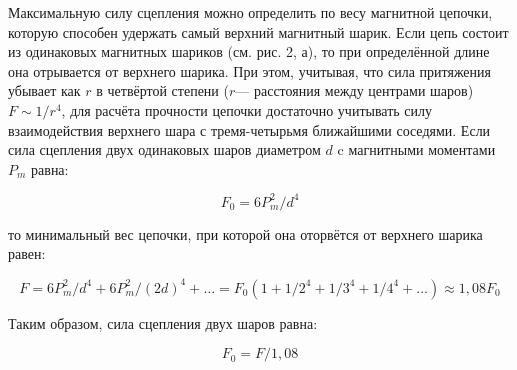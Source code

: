 \documentclass[a4paper, 12pt]{article}
\begin{document}
Максимальную силу сцепления можно определить по весу магнитной цепочки, которую способен удержать самый верхний магнитный шарик. Если цепь состоит из одинаковых магнитных шариков (см. рис. 2, а), то при определённой длине она 
отрывается от верхнего шарика. При этом, учитывая, что сила притяжения убывает как $r$ в четвёртой степени ($r$— расстояния между центрами шаров) $F \sim 1 / r^{4}$, для расчёта прочности цепочки достаточно учитывать силу взаимодействия верхнего шара с тремя-четырьмя ближайшими соседями.
Если сила сцепления двух одинаковых шаров диаметром $d$ c магнитными моментами $P_m$ равна:

  \begin{center}
\begin{equation}
F_{0}=6 P_{m}^{2} / d^{4}
\end{equation}
\end{center}

то минимальный вес цепочки, при которой она оторвётся от верхнего шарика равен:

  \begin{center}
\begin{equation}
F=6 P_{m}^{2} / d^{4}+6 P_{m}^{2} /(2 d)^{4}+\ldots=F_{0}\left(1+1 / 2^{4}+1 / 3^{4}+1 / 4^{4}+\ldots\right) \approx 1,08 F_{0}
\end{equation}
\end{center}

Таким образом, сила сцепления двух шаров равна:

  \begin{center}
\begin{equation}
F_{0}=F / 1,08
\end{equation}
\end{center}
\end{document}

